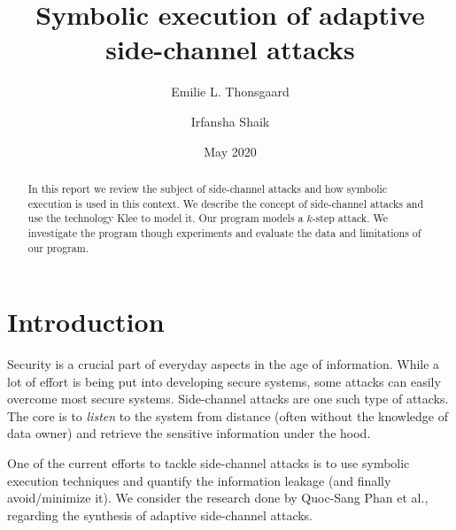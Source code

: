 \documentclass[11pt,a4paper,notitlepage]{article}
\title{Symbolic execution of adaptive side-channel attacks}
\author{Emilie L. Thonsgaard \and Irfansha Shaik}
\date{May 2020}
\begin{document}
\begin{titlingpage}
    \maketitle
    \begin{abstract}
        In this report we review the subject of side-channel attacks and how symbolic execution is used in this context. We describe the concept of side-channel attacks and use the technology Klee to model it. Our program models a $k$-step attack. We investigate the program though experiments and evaluate the data and limitations of our program.
    \end{abstract}
\end{titlingpage}

\tableofcontents
\newpage
\setcounter{section}{-1}




\newpage

\section{Introduction}
\label{cha:introduction}

Security is a crucial part of everyday aspects in the age of information.
While a lot of effort is being put into developing secure systems, some attacks can easily overcome most secure systems.
Side-channel attacks are one such type of attacks. The core is to \emph{listen} to the system from distance (often without the knowledge of data owner) and retrieve the sensitive information under the hood.

One of the current efforts to tackle side-channel attacks is to use symbolic execution techniques and quantify the information leakage (and finally avoid/minimize it).
We consider the research done by Quoc-Sang Phan et al., \cite{phan2017synthesis} regarding the synthesis of adaptive side-channel attacks.
\end{document}
